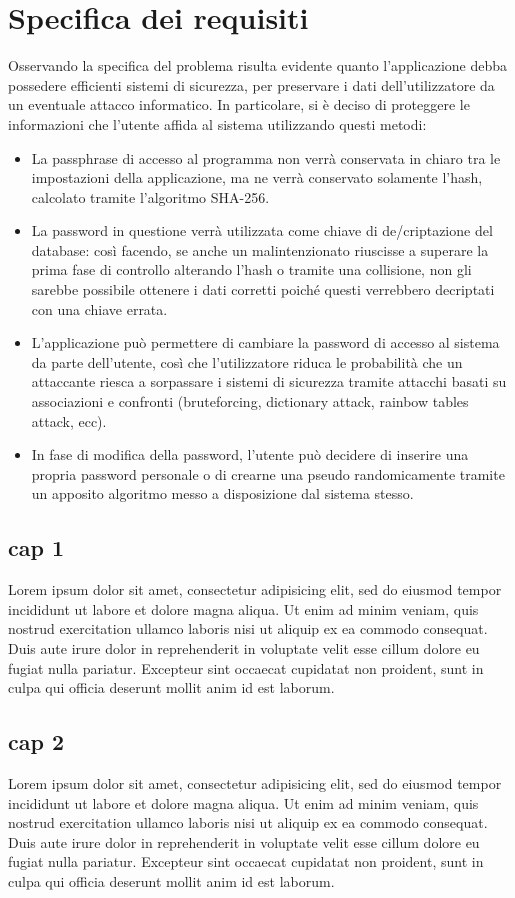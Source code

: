 \documentclass[a4paper,10pt]{report} %
\begin{document}
\part{Specifica dei requisiti} %
	Osservando la specifica del problema risulta evidente quanto l’applicazione
	debba possedere efficienti sistemi di sicurezza, per preservare i dati dell’utilizzatore
	da un eventuale attacco informatico.\vfill
	In particolare, si è deciso di proteggere le informazioni che l’utente affida
	al sistema utilizzando questi metodi:\vfill
	\begin{itemize}
			\item La passphrase di accesso al programma non verrà conservata in chiaro
				tra le impostazioni della applicazione, ma ne verrà conservato solamente l’hash,
				calcolato tramite l’algoritmo SHA-256.
			\item La password in questione verrà utilizzata come chiave di de/criptazione del database:
				così facendo, se anche un malintenzionato riuscisse a superare la prima fase di controllo
				alterando l’hash o tramite una collisione, non gli sarebbe possibile ottenere i dati corretti
				poiché questi verrebbero decriptati con una chiave errata.
			\item	L’applicazione può permettere di cambiare la password di accesso al sistema da parte dell’utente,
				così che l’utilizzatore riduca le probabilità che un attaccante riesca a sorpassare i
				sistemi di sicurezza tramite attacchi basati su associazioni e confronti
				(bruteforcing, dictionary attack, rainbow tables attack, ecc).
			\item	In fase di modifica della password, l’utente può decidere di inserire una
			propria password personale o di crearne una pseudo randomicamente tramite un
			apposito algoritmo messo a disposizione dal sistema stesso.
	\end{itemize}
  \chapter{cap 1}
    Lorem ipsum dolor sit amet, consectetur adipisicing elit, sed do eiusmod tempor incididunt ut labore et dolore magna aliqua. Ut enim ad minim veniam, quis nostrud exercitation ullamco laboris nisi ut aliquip ex ea commodo consequat. Duis aute irure dolor in reprehenderit in voluptate velit esse cillum dolore eu fugiat nulla pariatur. Excepteur sint occaecat cupidatat non proident, sunt in culpa qui officia deserunt mollit anim id est laborum.
  \chapter{cap 2}
    Lorem ipsum dolor sit amet, consectetur adipisicing elit, sed do eiusmod tempor incididunt ut labore et dolore magna aliqua. Ut enim ad minim veniam, quis nostrud exercitation ullamco laboris nisi ut aliquip ex ea commodo consequat. Duis aute irure dolor in reprehenderit in voluptate velit esse cillum dolore eu fugiat nulla pariatur. Excepteur sint occaecat cupidatat non proident, sunt in culpa qui officia deserunt mollit anim id est laborum.
\end{document}
